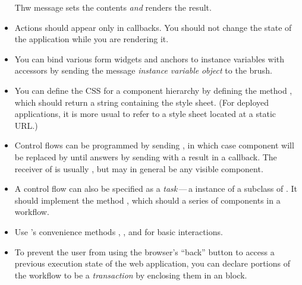 \documentclass[a4paper,10pt,twoside]{book}
\begin{document}
\begin{itemize}
  Thw  message sets the contents \emph{and} renders the result.
  \item Actions should appear only in callbacks.
You should not change the state of the application while you are rendering it.
  \item You can bind various form widgets and anchors to instance variables with accessors by sending the message  \emph{instance variable}  \emph{object} to the brush.
  \item You can define the CSS for a component hierarchy by defining the method , which should return a string containing the style sheet.
  (For deployed applications, it is more usual to refer to a style sheet located at a static URL.)
  \item Control flows can be programmed by sending , in which case component  will be replaced by  until  answers by sending  with a result in a callback.
  The receiver of  is usually , but may in general be any visible component.
  \item A control flow can also be specified as a \emph{task}\,---\,a instance of a subclass of . It should implement the method , which should  a series of components in a workflow.
  \item Use 's convenience methods , ,  and  for basic interactions.
  \item To prevent the user from using the browser's ``back'' button to access a previous execution state of the web application, you can declare portions of the workflow to be a \emph{transaction} by enclosing them in an  block.
\end{itemize}

\ifx\wholebook\relax\else 
   
   
\end{document}
